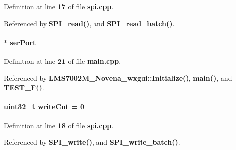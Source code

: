 Definition at line {\bf 17} of file {\bf spi.\+cpp}.



Referenced by {\bf S\+P\+I\+\_\+read()}, and {\bf S\+P\+I\+\_\+read\+\_\+batch()}.

\paragraph[{ser\+Port}]{$\ast$ ser\+Port}\label{spi_8cpp_a0d20ae1076940f5f69e66c3c90cb4f98}


Definition at line {\bf 21} of file {\bf main.\+cpp}.



Referenced by {\bf L\+M\+S7002\+M\+\_\+\+Novena\+\_\+wxgui\+::\+Initialize()}, {\bf main()}, and {\bf T\+E\+S\+T\+\_\+\+F()}.

\paragraph[{write\+Cnt}]{\setlength{\rightskip}{0pt plus 5cm}uint32\+\_\+t write\+Cnt = 0}\label{spi_8cpp_a89c5030afcecb6ba0ca486e477bdb595}


Definition at line {\bf 18} of file {\bf spi.\+cpp}.



Referenced by {\bf S\+P\+I\+\_\+write()}, and {\bf S\+P\+I\+\_\+write\+\_\+batch()}.

